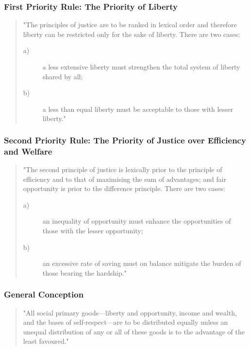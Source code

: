 \documentclass[11pt, oneside]{book}   	%
\begin{document}
\subsubsection{First Priority Rule: The Priority of Liberty}

\begin{quote}
"The principles of justice are to be ranked in lexical order and therefore liberty can be restricted only for the sake of liberty.
There are two cases:
\begin{description}
\item[ a)] a less extensive liberty must strengthen the total system of liberty shared by all;
\item[ b)] a less than equal liberty must be acceptable to those with lesser liberty."
\end{description}
\end{quote}

\subsubsection{Second Priority Rule: The Priority of Justice over Efficiency and Welfare}

\begin{quote}
"The second principle of justice is lexically prior to the principle of efficiency and to that of maximising the sum of advantages; and fair opportunity is prior to the difference principle. There are two cases:
\begin{description}
\item[ a)] an inequality of opportunity must enhance the opportunities of those with the lesser opportunity;
\item[ b)] an excessive rate of saving must on balance mitigate the burden of those bearing the hardship."
\end{description}
\end{quote}

\subsubsection{General Conception}

\begin{quote}
"All social primary goods---liberty and opportunity, income and wealth, and the bases of self-respect---are to be distributed equally unless an unequal distribution of any or all of these goods is to the advantage of the least favoured."
\end{quote}
\end{document}
